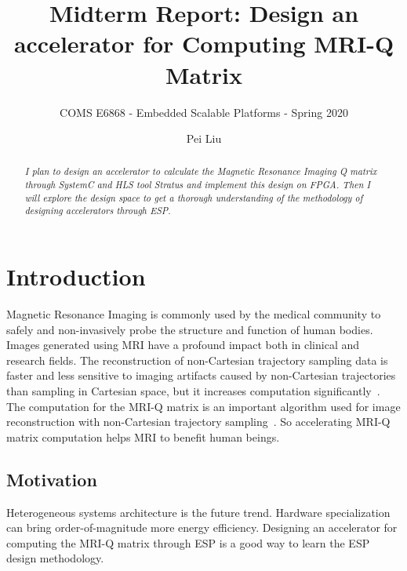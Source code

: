 \documentclass{sig-alternate}
\begin{document}
\title{\Large\bf Midterm Report: Design an accelerator for Computing MRI-Q Matrix}
\subtitle{\normalsize COMS E6868 - Embedded Scalable Platforms - Spring 2020}

\author{
\alignauthor
Pei Liu\\
\vspace{0.2cm}
}

\vspace{-2cm}

\maketitle

\vspace{-2cm}

\begin{abstract}
{\small\em
  I plan to design an accelerator to calculate the Magnetic Resonance Imaging Q matrix through SystemC and HLS tool Stratus and implement this design on FPGA. Then I will explore the design space to get a thorough understanding of the methodology of designing accelerators through ESP. 
}
\end{abstract}

\section{Introduction}
\label{sec:intro}
Magnetic Resonance Imaging is commonly used by the medical community to safely and non-invasively probe the structure and function of human bodies. Images generated using MRI have a profound impact both in clinical and research fields. The reconstruction of non-Cartesian trajectory sampling data is faster and less sensitive to imaging artifacts caused by non-Cartesian trajectories than sampling in Cartesian space, but it increases computation significantly~\cite{stone2008accelerating}. The computation for the MRI-Q matrix is an important algorithm used for image reconstruction with non-Cartesian trajectory sampling~\cite{stratton2012parboil}. So accelerating MRI-Q matrix computation helps MRI to benefit human beings.

\subsection{Motivation}
Heterogeneous systems architecture is the future trend. Hardware specialization can bring order-of-magnitude more energy efficiency. Designing an accelerator for computing the MRI-Q matrix through ESP is a good way to learn the ESP design methodology.
\end{document}
